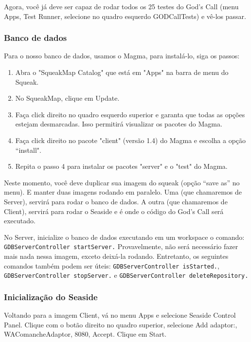 Agora, você já deve ser capaz de rodar todos os 25 testes do God's Call (menu Apps, Test Runner, selecione no quadro esquerdo GODCallTests) e vê-los passar.

\subsubsection{Banco de dados}

Para o nosso banco de dados, usamos o Magma, para instalá-lo, siga os passos:

\begin{enumerate}
\item Abra o "SqueakMap Catalog" que está em "Apps" na barra de menu do Squeak.
\item No SqueakMap, clique em Update.
\item Faça click direito no quadro esquerdo superior e garanta que todas as opções estejam desmarcadas. Isso permitirá visualizar os pacotes do Magma.
\item Faça click direito no pacote "client" (versão 1.4) do Magma e escolha a opção ``install".
\item Repita o passo 4 para instalar os pacotes "server" e o "test" do Magma.
\end{enumerate}

Neste momento, você deve duplicar sua imagem do squeak (opção ``save as'' no menu). E manter duas imagens rodando em paralelo. Uma (que chamaremos de Server), servirá para rodar o banco de dados. A outra (que chamaremos de Client), servirá para rodar o Seaside e é onde o código do God's Call será executado.

No Server, inicialize o banco de dados executando em um workspace o comando: \texttt{GDBServerController startServer.} Provavelmente, não será necessário fazer mais nada nessa imagem, exceto deixá-la rodando. Entretanto, os seguintes comandos também podem ser úteis: \texttt{GDBServerController isStarted.}, \texttt{GDBServerController stopServer.} e \texttt{GDBServerController deleteRepository.}


\subsubsection{Inicialização do Seaside}

Voltando para a imagem Client, vá no menu Apps e selecione Seaside Control Panel. Clique com o botão direito no quadro superior, selecione Add adaptor:, WAComancheAdaptor, 8080, Accept. Clique em Start.

